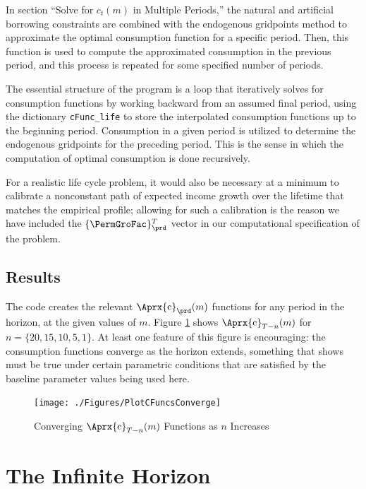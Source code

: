 \documentclass[titlepage, headings=optiontotocandhead]{econtex}
\newcommand{\MoM}{\ifthenelse{\boolean{MoMVersion}}}
\begin{document}
In section ``Solve for $c_t(m)$ in Multiple Periods,'' the natural and artificial borrowing constraints are combined with the endogenous gridpoints method to approximate the optimal consumption function for a specific period. Then, this function is used to compute the approximated consumption in the previous period, and this process is repeated for some specified number of periods.

The essential structure of the program is a loop that iteratively solves for consumption functions by working backward from an assumed final period, using the dictionary \texttt{cFunc\_life} to store the interpolated consumption functions up to the beginning period. Consumption in a given period is utilized to determine the endogenous gridpoints for the preceding period. This is the sense in which the computation of optimal consumption is done recursively.

For a realistic life cycle problem, it would also be necessary at a
minimum to calibrate a nonconstant path of expected income growth over the
lifetime that matches the empirical profile; allowing for such
a calibration is the reason we have included the $\{\PermGroFac\}_{\prd}^{T}$
vector in our computational specification of the problem.

\hypertarget{results}{}
\subsection{Results}

The code creates the relevant $\Aprx{\mathrm{c}}_{\prd}(m)$ functions for any period in the horizon, at the given values of $m$.  Figure \ref{fig:PlotCFuncsConverge} shows $\Aprx{\mathrm{c}}_{T-n}(m)$ for $n=\{20,15,10,5,1\}$.  At least one feature of this figure is encouraging: the consumption functions converge as the horizon extends, something that \cite{BufferStockTheory} shows must be true under certain parametric conditions that are satisfied by the baseline parameter values being used here.

\hypertarget{PlotCFuncsConverge}{}
\begin{figure}
  \texttt{[image: ./Figures/PlotCFuncsConverge]}
  \caption{Converging $\Aprx{\mathrm{c}}_{T-n}(m)$ Functions as $n$ Increases}
  \label{fig:PlotCFuncsConverge}
\end{figure}



\hypertarget{the-infinite-horizon}{}
\section{The Infinite Horizon}\label{sec:the-infinite-horizon}
\end{document}
